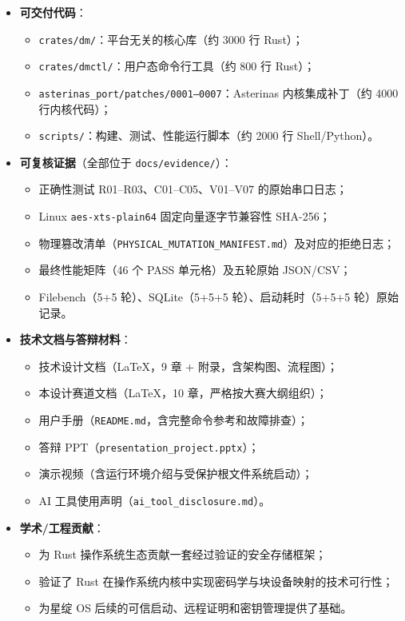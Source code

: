 \begin{itemize}
    \item \textbf{可交付代码}：
    \begin{itemize}
        \item \texttt{crates/dm/}：平台无关的核心库（约 3000 行 Rust）；
        \item \texttt{crates/dmctl/}：用户态命令行工具（约 800 行 Rust）；
        \item \texttt{asterinas\_port/patches/0001--0007}：Asterinas 内核集成补丁（约 4000 行内核代码）；
        \item \texttt{scripts/}：构建、测试、性能运行脚本（约 2000 行 Shell/Python）。
    \end{itemize}
    
    \item \textbf{可复核证据}（全部位于 \texttt{docs/evidence/}）：
    \begin{itemize}
        \item 正确性测试 R01–R03、C01–C05、V01–V07 的原始串口日志；
        \item Linux \texttt{aes-xts-plain64} 固定向量逐字节兼容性 SHA-256；
        \item 物理篡改清单（\texttt{PHYSICAL\_MUTATION\_MANIFEST.md}）及对应的拒绝日志；
        \item 最终性能矩阵（46 个 PASS 单元格）及五轮原始 JSON/CSV；
        \item Filebench（5+5 轮）、SQLite（5+5+5 轮）、启动耗时（5+5+5 轮）原始记录。
    \end{itemize}
    
    \item \textbf{技术文档与答辩材料}：
    \begin{itemize}
        \item 技术设计文档（LaTeX，9 章 + 附录，含架构图、流程图）；
        \item 本设计赛道文档（LaTeX，10 章，严格按大赛大纲组织）；
        \item 用户手册（\texttt{README.md}，含完整命令参考和故障排查）；
        \item 答辩 PPT（\texttt{presentation\_project.pptx}）；
        \item 演示视频（含运行环境介绍与受保护根文件系统启动）；
        \item AI 工具使用声明（\texttt{ai\_tool\_disclosure.md}）。
    \end{itemize}
    
    \item \textbf{学术/工程贡献}：
    \begin{itemize}
        \item 为 Rust 操作系统生态贡献一套经过验证的安全存储框架；
        \item 验证了 Rust 在操作系统内核中实现密码学与块设备映射的技术可行性；
        \item 为星绽 OS 后续的可信启动、远程证明和密钥管理提供了基础。
    \end{itemize}
\end{itemize}


